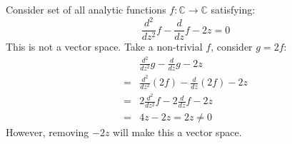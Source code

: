 \begin{example}\rm\nextline
	Consider set of all analytic functions $f:\mathbb{C}\xrightarrow{}\mathbb{C}$ satisfying:
	$$
		\frac{d^2}{dz^2}f-\frac{d}{dz}f-2z=0
	$$
	This is not a vector space. Take a non-trivial $f$, consider $g=2f$:
	\begin{equation}
		\begin{split}\nonumber
			&\frac{d^2}{dz^2}g-\frac{d}{dz}g-2z\\
			=&\frac{d^2}{dz^2}(2f)-\frac{d}{dz}(2f)-2z\\
			=&2\frac{d^2}{dz^2}f-2\frac{d}{dz}f-2z\\
			=&4z-2z=2z\neq0
		\end{split}
	\end{equation}
	However, removing $-2z$ will make this a vector space.
\end{example}

